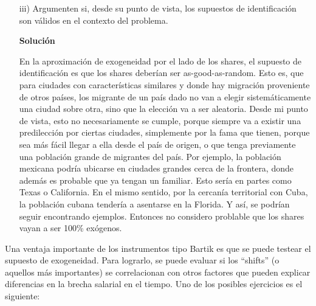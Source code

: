 \documentclass[a4paper, answers, addpoints, 11pt]{exam}
\newenvironment{solucion}{%
  \begin{mdframed}[
    backgroundcolor=blue!5,    %
    linecolor=blue!50,          %
    linewidth=2pt,              %
    leftmargin=10pt,            %
    rightmargin=8pt,           %
    topline=true,              %
    bottomline=true,            %
    roundcorner=10pt,           %
    innerleftmargin=10pt,       %
    innerrightmargin=10pt,      %
    innerbottommargin=10pt,     %
    innertopmargin=10pt         %
  ]%
  \begin{tcolorbox}[colframe=blue!50!black, colback=blue!50, coltitle=white, sharp corners=all, boxrule=1mm, width=\textwidth, halign=left, valign=center, top=0mm, bottom=0mm, left=0mm, right=0mm] \textbf{Solución} \end{tcolorbox} }{\end{mdframed}}
\begin{document}
\begin{itemize}
\begin{itemize}
\begin{solucion}
Las regresiones incluyen controles por logaritmo de población, proporción de estudiantes universitarios e industria manufacturera en 1980 y 1990. Los estadísticos F de la primera etapa son sólidos (por ejemplo, 40.62 en el caso COLL-IV), lo que respalda la relevancia del instrumento shift-share. El R$^2$ oscila entre 0.20 y 0.38, lo que indica una capacidad explicativa razonable del modelo.
\end{solucion}
    \item[iii)] Argumenten si, desde su punto de vista, los supuestos de identificación son válidos en el contexto del problema.
    \begin{solucion}
    En la aproximación de exogeneidad por el lado de los shares, el supuesto de identificación es que los shares deberían ser as-good-as-random. Esto es, que para ciudades con características similares y donde hay migración proveniente de otros países, los migrante de un país dado no van a elegir sistemáticamente una ciudad sobre otra, sino que la elección va a ser aleatoria. Desde mi punto de vista, esto no necesariamente se cumple, porque siempre va a existir una predilección por ciertas ciudades, simplemente por la fama que tienen, porque sea más fácil llegar a ella desde el país de origen, o que tenga previamente una población grande de migrantes del país. Por ejemplo, la población mexicana podría ubicarse en ciudades grandes cerca de la frontera, donde además es probable que ya tengan un familiar. Esto sería en partes como Texas o California. En el mismo sentido, por la cercanía territorial con Cuba, la población cubana tendería a asentarse en la Florida. Y así, se podrían seguir encontrando ejemplos. Entonces no considero problable que los shares vayan a ser 100\% exógenos. 
\end{solucion}

    
   
    
    \end{itemize}
    
\end{itemize}

Una ventaja importante de los instrumentos tipo Bartik es que se puede testear el supuesto de exogeneidad. Para lograrlo, se puede evaluar si los ``shifts'' (o aquellos más importantes) se correlacionan con otros factores que pueden explicar diferencias en la brecha salarial en el tiempo. Uno de los posibles ejercicios es el siguiente: \\
\end{document}
